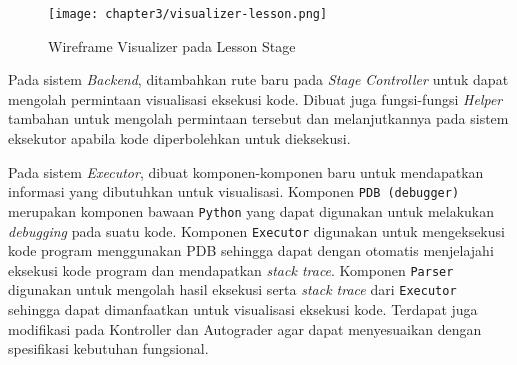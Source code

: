 \begin{figure}[H]
  \centering
  \texttt{[image: chapter3/visualizer-lesson.png]}
  \caption{Wireframe Visualizer pada Lesson Stage} \label{fig:wireframe-lesson}
\end{figure}

Pada sistem \textit{Backend}, ditambahkan rute baru pada \textit{Stage Controller} untuk dapat mengolah permintaan visualisasi eksekusi kode. Dibuat juga fungsi-fungsi \textit{Helper} tambahan untuk mengolah permintaan tersebut dan melanjutkannya pada sistem eksekutor apabila kode diperbolehkan untuk dieksekusi.

Pada sistem \textit{Executor}, dibuat komponen-komponen baru untuk mendapatkan informasi yang dibutuhkan untuk visualisasi. Komponen \verb|PDB (debugger)| merupakan komponen bawaan \verb|Python| yang dapat digunakan untuk melakukan \textit{debugging} pada suatu kode. Komponen \verb|Executor| digunakan untuk mengeksekusi kode program menggunakan PDB sehingga dapat dengan otomatis menjelajahi eksekusi kode program dan mendapatkan \textit{stack trace}. Komponen \verb|Parser| digunakan untuk mengolah hasil eksekusi serta \textit{stack trace} dari \verb|Executor| sehingga dapat dimanfaatkan untuk visualisasi eksekusi kode. Terdapat juga modifikasi pada Kontroller dan Autograder agar dapat menyesuaikan dengan spesifikasi kebutuhan fungsional.

